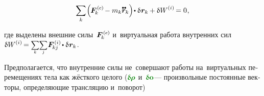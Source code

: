 \begin{otherlanguage}{russian}
\nopagebreak\vspace{-0.2em}\begin{equation}\label{discrete:principleofvirtualwork.externalinternal}
\displaystyle \sum_k \hspace{-0.2ex} \left(^{\mathstrut} \hspace{-0.25ex} \bm{F}^{\expexternal}_{\hspace{-0.16ex}k} \hspace{-0.1ex} - m_k \mathdotdotabove{\bm{r}}_k \right) \hspace{-0.32ex} \dotp \variation{\hspace{.1ex}\bm{r}_k} \hspace{-0.1ex}
+ \variation{\internalwork} \hspace{-0.1ex} = 0 \hspace{.1ex},
\vspace{-0.25em}\end{equation}

\vspace{-0.1em} \noindent где выделены внешние силы~${\bm{F}^{\expexternal}_{\hspace{-0.16ex}k}}$ и~виртуальная работа внутренних сил
${\variation{\internalwork} \hspace{-0.12ex} = \scalebox{0.8}[0.84]{$\displaystyle \underset{\raisemath{.25ex}{\smash{k}}}{\sum}$} \scalebox{0.8}[0.84]{$\displaystyle \underset{\raisemath{.25ex}{\smash{j}}}{\sum}$} \hspace{.12ex} \bm{F}^{\expinternal}_{\hspace{-0.16ex}kj} \hspace{-0.1ex} \dotp \variation{\hspace{.1ex}\bm{r}_k} \hspace{.1ex}}$.

\vspace{-0.1em} Предполагается, что внутренние силы не~совершают работы на~виртуальных перемещениях тела как жёсткого целого (${\constvarvector{\hspace{-0.1ex}\bm{\rho}}}$ и~${\constvarvector{\bm{o}}}$\:--- произвольные постоянные векторы, определяющие трансляцию и~поворот)


\end{otherlanguage}
